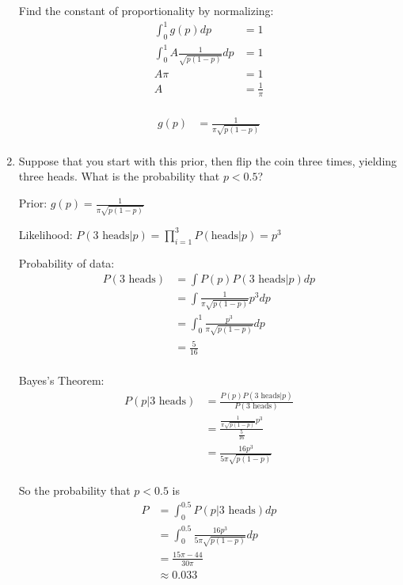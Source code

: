 \begin{enumerate}[label=\textbf{\Alph*}.]
    Find the constant of proportionality by normalizing:
    \begin{align*}
        \int_0^1 g(p)dp &= 1 \\
        \int_0^1 A \frac{1}{\sqrt{p(1-p)}} dp &= 1 \\
        A \pi &= 1 \\
        A &= \frac{1}{\pi} \\
    \end{align*}

    \begin{align*}
        g(p) &= \frac{1}{\pi\sqrt{p(1-p)}} \\
    \end{align*}

    \item Suppose that you start with this prior, then flip the coin three times, yielding three heads. What is the probability that $p<0.5$?
    
    Prior: $g(p) = \frac{1}{\pi\sqrt{p(1-p)}}$

    Likelihood: $P(\text{3 heads}|p) = \prod_{i=1}^3 P(\text{heads}|p) = p^3$

    Probability of data:
    \begin{align*}
        P(\text{3 heads}) &= \int P(p) P(\text{3 heads}|p) dp \\
        &= \int \frac{1}{\pi\sqrt{p(1-p)}} p^3 dp \\
        &= \int_0^1 \frac{p^3}{\pi\sqrt{p(1-p)}} dp \\
        &= \frac{5}{16} \\
    \end{align*}

    Bayes's Theorem:
    \begin{align*}
        P(p|\text{3 heads}) &= \frac{P(p)P(\text{3 heads}|p)}{P(\text{3 heads})} \\
        &= \frac{\frac{1}{\pi\sqrt{p(1-p)}} p^3 }{\frac{5}{16}} \\
        &= \frac{16p^3}{5\pi\sqrt{p(1-p)}} \\
    \end{align*}

    So the probability that $p<0.5$ is
    \begin{align*}
        P &= \int_0^{0.5} P(p|\text{3 heads}) dp \\
        &= \int_0^{0.5} \frac{16p^3}{5\pi\sqrt{p(1-p)}} dp \\
        &= \frac{15\pi - 44}{30\pi} \\
        &\approx 0.033 \\
    \end{align*}


\end{enumerate}
